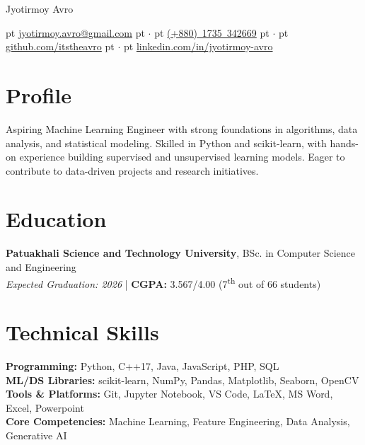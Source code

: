 \documentclass[10pt, letterpaper]{article}
\newenvironment{header}{
    \setlength{\topsep}{0pt}\par\kern\topsep\centering\linespread{1.5}
}{
    \par\kern\topsep
} %
\let\hrefWithoutArrow\href
\begin{document}
    \newcommand{\AND}{\unskip
        \cleaders\copy\ANDbox\hskip\wd\ANDbox
        \ignorespaces
    }
    \newsavebox\ANDbox
    \sbox\ANDbox{$|$}

    \begin{header}
        \fontsize{25 pt}{25 pt}\selectfont Jyotirmoy Avro
        
        
        \normalsize
         pt%
        \mbox{\hrefWithoutArrow{mailto:jyotirmoy.avro@gmail.com}{jyotirmoy.avro@gmail.com}}%
         pt%
        {$\cdot$}
         pt%
        \mbox{\hrefWithoutArrow{tel:+8801735342669}{(+880) 1735 342669}}%
         pt%
        {$\cdot$}
         pt%
        \mbox{\hrefWithoutArrow{https://github.com/itstheavro}{github.com/itstheavro}}%
         pt%
        {$\cdot$}
         pt%
        \mbox{\hrefWithoutArrow{https://linkedin.com/in/jyotirmoy-avro}{linkedin.com/in/jyotirmoy-avro}}%
    \end{header}

\section{Profile}
Aspiring Machine Learning Engineer with strong foundations in algorithms, data analysis, and statistical modeling. Skilled in Python and scikit-learn, with hands-on experience building supervised and unsupervised learning models. Eager to contribute to data-driven projects and research initiatives.


\section{Education}
\textbf{Patuakhali Science and Technology University}, BSc. in Computer Science and Engineering\\
\textit{Expected Graduation: 2026} | \textbf{CGPA:} 3.567/4.00 (7\textsuperscript{th} out of 66 students)\\


\section{Technical Skills}
\textbf{Programming:} Python, C++17, Java, JavaScript, PHP, SQL\\
\textbf{ML/DS Libraries:} scikit-learn, NumPy, Pandas, Matplotlib, Seaborn, OpenCV\\
\textbf{Tools \& Platforms:} Git, Jupyter Notebook, VS Code, LaTeX, MS Word, Excel, Powerpoint\\
\textbf{Core Competencies:} Machine Learning, Feature Engineering, Data Analysis, Generative AI
\end{document}
